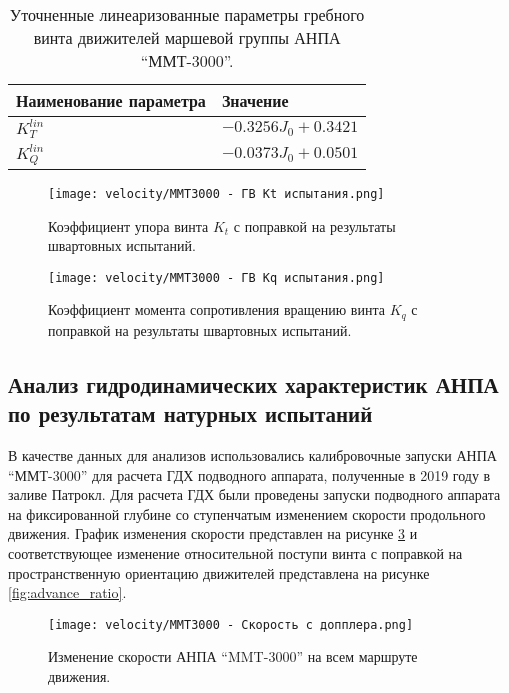 \begin{table}
    \caption{Уточненные линеаризованные параметры гребного винта движителей маршевой группы АНПА ``ММТ-3000''.}
    \label{tab:mmt3000_propeller_bollard}
    \centering
    \begin{tabular}{ll}
        \toprule
        Наименование параметра  & Значение\\
        \midrule
        $K_T^{lin}$ & $-0.3256J_0 + 0.3421$ \\
        $K_Q^{lin}$ & $-0.0373J_0 + 0.0501$ \\
        \bottomrule
    \end{tabular}
\end{table}

\begin{figure}[ht]
    \centering
    \texttt{[image: velocity/MMT3000 - ГВ Kt испытания.png]}
    \caption{Коэффициент упора винта $K_t$ с поправкой на результаты швартовных испытаний.}
    \label{fig:mmt3000_propeller_kt_bollard}
\end{figure}

\begin{figure}[ht]
    \centering
    \texttt{[image: velocity/MMT3000 - ГВ Kq испытания.png]}
    \caption{Коэффициент момента сопротивления вращению винта $K_q$ с поправкой на результаты швартовных испытаний.}
    \label{fig:mmt3000_propeller_kq_bollard}
\end{figure}

\subsection{Анализ гидродинамических характеристик АНПА по результатам натурных испытаний}
В качестве данных для анализов использовались калибровочные запуски АНПА ``ММТ-3000'' для расчета ГДХ подводного аппарата, полученные в 2019 году в заливе Патрокл.
Для расчета ГДХ были проведены запуски подводного аппарата на фиксированной глубине со ступенчатым изменением скорости продольного движения.
График изменения скорости представлен на рисунке \ref{fig:mmt3000_velocity} и соответствующее изменение относительной поступи винта с поправкой на пространственную ориентацию движителей представлена на рисунке \ref{fig:advance_ratio}.

\begin{figure}[ht]
    \centering
    \texttt{[image: velocity/MMT3000 - Скорость с допплера.png]}
    \caption{Изменение скорости АНПА ``MMT-3000'' на всем маршруте движения.}
    \label{fig:mmt3000_velocity}
\end{figure}

